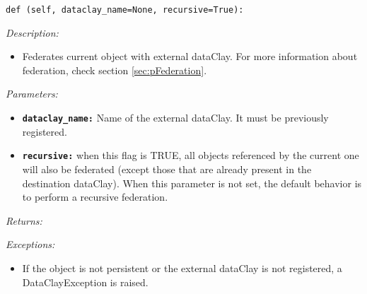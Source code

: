 \begin{dBox}
\texttt{def (self, dataclay\_name=None, recursive=True):}
\LINE

{\it Description:}

\begin{itemize}
	\item Federates current object with external dataClay. For more information about federation, check section \ref{sec:pFederation}.
\end{itemize}

{\it Parameters:}

\begin{itemize}
  \item \texttt{\bfseries dataclay\_name:} Name of the external dataClay. It must be previously registered.
  \item \texttt{\bfseries recursive:} when this flag is TRUE, all objects referenced by the current one will also be federated (except those that are already present in the destination dataClay). When this parameter is not set, the default behavior is to perform a recursive federation.
\end{itemize}
{\it Returns:}

{\it Exceptions:}

\begin{itemize}
  \item If the object is not persistent or the external dataClay is not registered, a DataClayException is raised.

\end{itemize}

\end{dBox}


